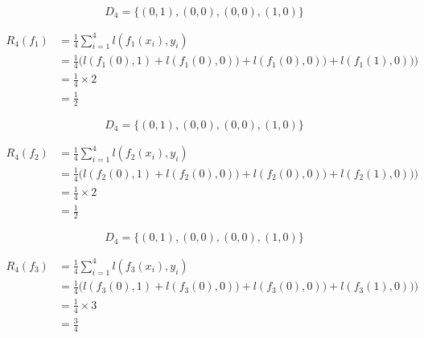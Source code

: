 \documentclass[usenames,dvipsnames]{beamer}
\begin{document}
\begin{frame}{}
    \begin{equation}
        D_4 = \{(0, 1), (0, 0), (0, 0), (1, 0)\}
    \end{equation}

    \begin{equation}
       \begin{aligned}
           \label{eq:}
           R_4(f_1) &= \frac{1}{4} \sum^{4}_{i=1} l(f_1(x_i), y_i)\\
           &= \frac{1}{4} \Big(l(f_1(0), 1) + l(f_1(0), 0))+ l(f_1(0), 0))+l(f_1(1), 0))  \Big)\\
           &= \frac{1}{4} \times 2\\
           &= \frac{1}{2} 
       \end{aligned} 
    \end{equation}
\end{frame}

\begin{frame}{}
    \begin{equation}
        D_4 = \{(0, 1), (0, 0), (0, 0), (1, 0)\}
    \end{equation}

    \begin{equation}
       \begin{aligned}
           \label{eq:}
           R_4(f_2) &= \frac{1}{4} \sum^{4}_{i=1} l(f_2(x_i), y_i)\\
           &= \frac{1}{4} \Big(l(f_2(0), 1) + l(f_2(0), 0))+ l(f_2(0), 0))+l(f_2(1), 0))  \Big)\\
           &= \frac{1}{4} \times 2\\
           &= \frac{1}{2} 
       \end{aligned} 
    \end{equation}
\end{frame}

\begin{frame}{}
    \begin{equation}
        D_4 = \{(0, 1), (0, 0), (0, 0), (1, 0)\}
    \end{equation}

    \begin{equation}
       \begin{aligned}
           \label{eq:}
           R_4(f_3) &= \frac{1}{4} \sum^{4}_{i=1} l(f_3(x_i), y_i)\\
           &= \frac{1}{4} \Big(l(f_3(0), 1) + l(f_3(0), 0))+ l(f_3(0), 0))+l(f_3(1), 0))  \Big)\\
           &= \frac{1}{4} \times 3\\
           &= \frac{3}{4} 
       \end{aligned} 
    \end{equation}
\end{frame}
\end{document}

